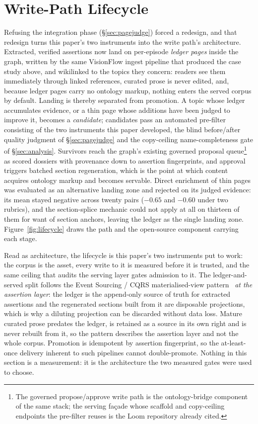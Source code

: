 \documentclass[10pt,twocolumn]{article}
\begin{document}
\section{Write-Path Lifecycle}\label{sec:lifecycle}
Refusing the integration phase (\S\ref{sec:pagejudge}) forced a redesign, and that redesign turns this paper's two
instruments into the write path's architecture. Extracted, verified assertions now land on
per-episode \emph{ledger pages} inside the graph, written by the same VisionFlow ingest pipeline
that produced the case study above, and wikilinked to the topics they concern: readers see them
immediately through linked references, curated prose is never edited, and, because ledger pages
carry no ontology markup, nothing enters the served corpus by default. Landing is thereby separated
from promotion. A topic whose ledger accumulates evidence, or a thin page whose additions have been
judged to improve it, becomes a \emph{candidate}; candidates pass an automated pre-filter consisting
of the two instruments this paper developed, the blind before/after quality judgment of
\S\ref{sec:pagejudge} and the copy-ceiling name-completeness gate of \S\ref{sec:analysis}.
Survivors reach the graph's existing governed proposal queue\footnote{The governed propose/approve
write path is the ontology-bridge component of the same stack; the serving fa\c{c}ade whose scaffold
and copy-ceiling endpoints the pre-filter reuses is the Loom repository already cited.} as scored
dossiers with provenance down to assertion fingerprints, and approval triggers batched section
regeneration, which is the point at which content acquires ontology markup and becomes servable.
Direct enrichment of thin pages was evaluated as an alternative landing zone and rejected on its
judged evidence: its mean stayed negative across twenty pairs ($-0.65$ and $-0.60$ under two
rubrics), and the section-splice mechanic could not apply at all on thirteen of them for want of
section anchors, leaving the ledger as the single landing zone. Figure~\ref{fig:lifecycle} draws the
path and the open-source component carrying each stage.

Read as architecture, the lifecycle is this paper's two instruments put to work: the corpus is the
asset, every write to it is measured before it is trusted, and the same ceiling that audits the
serving layer gates admission to it. The ledger-and-served split follows the Event Sourcing / CQRS
materialised-view pattern~\cite{fowler2005eventsourcing} \emph{at the assertion layer}: the ledger is
the append-only source of truth for extracted assertions and the regenerated sections built from it
are disposable projections, which is why a diluting projection can be discarded without data loss.
Mature curated prose predates the ledger, is retained as a source in its own right and is never
rebuilt from it, so the pattern describes the assertion layer and not the whole corpus. Promotion is
idempotent by assertion fingerprint, so the at-least-once delivery inherent to such pipelines cannot
double-promote. Nothing in this section is a measurement: it is the architecture the two measured
gates were used to choose.
\end{document}
